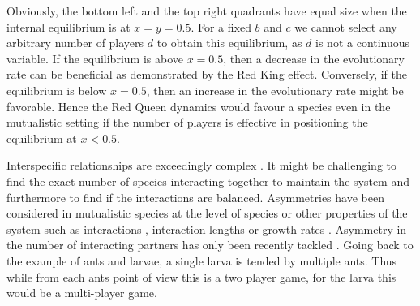 \documentclass[a4paper]{scrartcl}
\begin{document}
Obviously, the bottom left and the top right quadrants have equal size when the internal equilibrium is at $x = y = 0.5$.
For a fixed $b$ and $c$ we cannot select any arbitrary number of players $d$ to obtain this equilibrium, as $d$ is not a continuous variable.
If the equilibrium is above $x = 0.5$, then a decrease in the evolutionary rate can be beneficial as demonstrated by the Red King effect. 
Conversely, if the equilibrium is below $x=0.5$, then an increase in the evolutionary rate might be favorable.
Hence the Red Queen dynamics would favour a species even in the mutualistic setting if the number of players is effective in positioning the equilibrium at $x<0.5$.

Interspecific relationships are exceedingly complex \citep{blaser:2007aa}.
It might be challenging to find the exact number of species interacting together to maintain the system \citep{doebeli:1998aa,bronstein:2002aa,bascompte:2006aa} and furthermore to find if the interactions are balanced.
Asymmetries have been considered in mutualistic species at the level of species or other properties of the system such as interactions \citep{noe:1991aa}, interaction lengths \citep{johnstone:2002aa} or growth rates \citep{bergstrom:2003jf}.
Asymmetry in the number of interacting partners has only been recently tackled \citep{wang:2011aa}.
Going back to the example of ants and larvae, a single larva is tended by multiple ants.
Thus while from each ants point of view this is a two player game, for the larva this would be a multi-player game.
\end{document}
